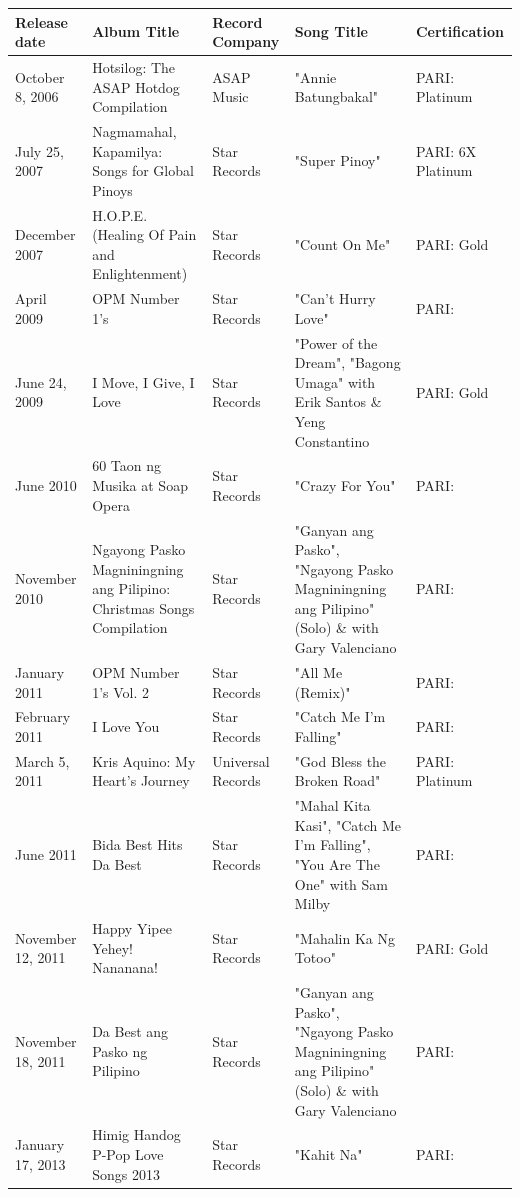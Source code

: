 \documentclass{article}
\begin{document}
\begin{tabular}{lllll}
\toprule
Release date & Album Title & Record Company & Song Title & Certification \\
\midrule
October 8, 2006 & Hotsilog: The ASAP Hotdog Compilation & ASAP Music & "Annie Batungbakal" & PARI: Platinum \\
July 25, 2007 & Nagmamahal, Kapamilya: Songs for Global Pinoys & Star Records & "Super Pinoy" & PARI: 6X Platinum \\
December 2007 & H.O.P.E. (Healing Of Pain and Enlightenment) & Star Records & "Count On Me" & PARI: Gold \\
April 2009 & OPM Number 1's & Star Records & "Can't Hurry Love" & PARI: \\
June 24, 2009 & I Move, I Give, I Love & Star Records & "Power of the Dream", "Bagong Umaga" with Erik Santos \& Yeng Constantino & PARI: Gold \\
June 2010 & 60 Taon ng Musika at Soap Opera & Star Records & "Crazy For You" & PARI: \\
November 2010 & Ngayong Pasko Magniningning ang Pilipino: Christmas Songs Compilation & Star Records & "Ganyan ang Pasko", "Ngayong Pasko Magniningning ang Pilipino" (Solo) \& with Gary Valenciano & PARI: \\
January 2011 & OPM Number 1's Vol. 2 & Star Records & "All Me (Remix)" & PARI: \\
February 2011 & I Love You & Star Records & "Catch Me I'm Falling" & PARI: \\
March 5, 2011 & Kris Aquino: My Heart’s Journey & Universal Records & "God Bless the Broken Road" & PARI: Platinum \\
June 2011 & Bida Best Hits Da Best & Star Records & "Mahal Kita Kasi", "Catch Me I'm Falling", "You Are The One" with Sam Milby & PARI: \\
November 12, 2011 & Happy Yipee Yehey! Nananana! & Star Records & "Mahalin Ka Ng Totoo" & PARI: Gold \\
November 18, 2011 & Da Best ang Pasko ng Pilipino & Star Records & "Ganyan ang Pasko", "Ngayong Pasko Magniningning ang Pilipino" (Solo) \& with Gary Valenciano & PARI: \\
January 17, 2013 & Himig Handog P-Pop Love Songs 2013 & Star Records & "Kahit Na" & PARI: \\
\bottomrule
\end{tabular}
\end{document}
